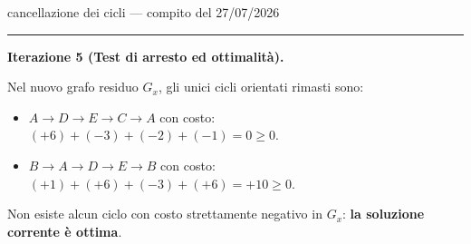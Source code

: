 \documentclass[11pt,a4paper]{article}
\newcommand{\mcfnodes}{%
  \node[nd] (A) at (0,2.1) {$A$};
  \node[nd] (B) at (0,-2.1) {$B$};
  \node[nd] (C) at (3.0,0) {$C$};
  \node[nd] (D) at (6.0,2.1) {$D$};
  \node[nd] (E) at (6.0,-2.1) {$E$};}
\newcommand{\ra}[4]{\draw[#1,thick,black!65] (#2) -- node[font=\scriptsize,black!70,fill=amber!5,inner sep=1pt]{$#4$} (#3);}
\newcommand{\cy}[3]{\draw[->,line width=1.2pt,crimson] (#1) to[bend left=16] node[font=\scriptsize,crimson,fill=amber!5,inner sep=1pt]{$#3$} (#2);}
\newcommand{\fa}[4]{\draw[->,thick,black!45] (#1) -- node[font=\scriptsize,black!55,sloped,above,inner sep=1.5pt]{$#3$} node[font=\small,teal,sloped,below,inner sep=1.5pt]{$\mathbf{#4}$} (#2);}
\begin{document}
\begin{es}{cancellazione dei cicli --- compito del 27/07/2026}
\begin{center}
\begin{minipage}[t]{0.48\textwidth}\centering
{}
\par\vspace{1mm}{\scriptsize $G_x$ post it. 3: evidenziato $\Gamma_4$ ($c=-1$, $\delta=1$)}
\end{minipage}\hfill
\begin{minipage}[t]{0.48\textwidth}\centering
{}
\par\vspace{1mm}{\scriptsize $G$ dopo iterazione 4 (costo $37$)}
\end{minipage}
\end{center}

\medskip
\hrule
\medskip

\textbf{Iterazione 5 (Test di arresto ed ottimalità).}

Nel nuovo grafo residuo $G_x$, gli unici cicli orientati rimasti sono:
\begin{itemize}[itemsep=0.1em]
\item $A \to D \to E \to C \to A$ con costo: $(+6) + (-3) + (-2) + (-1) = 0 \ge 0$.
\item $B \to A \to D \to E \to B$ con costo: $(+1) + (+6) + (-3) + (+6) = +10 \ge 0$.
\end{itemize}
Non esiste alcun ciclo con costo strettamente negativo in $G_x$: \textbf{la soluzione corrente è ottima}.


\end{es}
\end{document}
